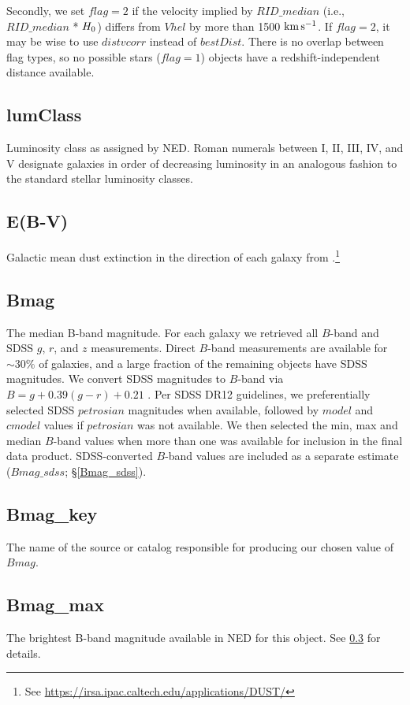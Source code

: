 \documentclass[twocolumn,tighten]{aastex62}
\newcommand{\kms}{$\rm km\, s^{-1}$}
\begin{document}
Secondly, we set $flag = 2$ if the velocity implied by $RID\_median$ (i.e., $RID\_median$ * $H_{\rm 0}$) differs from $Vhel$ by more than 1500 \kms. If $flag = 2$, it may be wise to use $distvcorr$ instead of $bestDist$. There is no overlap between flag types, so no possible stars ($flag=1$) objects have a redshift-independent distance available.


\subsection{lumClass} \label{lumClass}
Luminosity class as assigned by NED. Roman numerals between I, II, III, IV, and V designate galaxies in order of decreasing luminosity in an analogous fashion to the standard stellar luminosity classes.

\subsection{E(B-V)} \label{E(B-V)}
Galactic mean dust extinction in the direction of each galaxy from \cite{schlafly2011}.\footnote{See \url{https://irsa.ipac.caltech.edu/applications/DUST/}}


\subsection{Bmag} \label{Bmag}
The median B-band magnitude. For each galaxy we retrieved all $B$-band and SDSS $g$, $r$, and $z$ measurements. Direct $B$-band measurements are available for $\sim 30\%$ of galaxies, and a large fraction of the remaining objects have SDSS magnitudes. We convert SDSS magnitudes to $B$-band via $B = g + 0.39 (g-r) + 0.21$ \citep{jester2005}. Per SDSS DR12 guidelines, we preferentially selected SDSS $petrosian$ magnitudes when available, followed by $model$ and $cmodel$ values if $petrosian$ was not available. We then selected the min, max and median $B$-band values when more than one was available for inclusion in the final data product. SDSS-converted $B$-band values are included as a separate estimate ($Bmag\_sdss$; \S \ref{Bmag_sdss}). 

\subsection{Bmag\_key} \label{Bmag_key}
The name of the source or catalog responsible for producing our chosen value of $Bmag$.

\subsection{Bmag\_max}
The brightest B-band magnitude available in NED for this object. See \ref{Bmag} for details.
\end{document}

